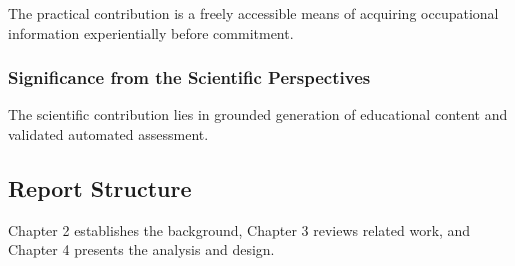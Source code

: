The practical contribution is a freely accessible means of acquiring occupational information experientially before commitment.

\subsubsection{Significance from the Scientific Perspectives}

The scientific contribution lies in grounded generation of educational content and validated automated assessment.

\subsection{Report Structure}

Chapter 2 establishes the background, Chapter 3 reviews related work, and Chapter 4 presents the analysis and design.
